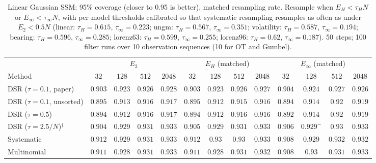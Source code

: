 \begin{table}[ht]
\centering
\small
\caption{Linear Gaussian SSM: 95\% coverage (closer to 0.95 is better), matched resampling rate. Resample when $E_H<\tau_HN$ or $E_\infty<\tau_\infty N$, with per-model thresholds calibrated so that systematic resampling resamples as often as under $E_2<0.5N$ (linear: $\tau_H{=}0.615$, $\tau_\infty{=}0.223$; ungm: $\tau_H{=}0.567$, $\tau_\infty{=}0.351$; volatility: $\tau_H{=}0.587$, $\tau_\infty{=}0.194$; bearing: $\tau_H{=}0.596$, $\tau_\infty{=}0.285$; lorenz63: $\tau_H{=}0.599$, $\tau_\infty{=}0.255$; lorenz96: $\tau_H{=}0.62$, $\tau_\infty{=}0.187$). 50 steps; 100 filter runs over 10 observation sequences (10 for OT and Gumbel).}
\label{tab:trigger-matched-linear-coverage95}
\begin{adjustbox}{max width=\linewidth}
\begin{tabular}{lcccc|cccc|cccc}
\toprule
 & \multicolumn{4}{c}{$E_2$} & \multicolumn{4}{c}{$E_H$ (matched)} & \multicolumn{4}{c}{$E_\infty$ (matched)} \\
\cmidrule(lr){2-5} \cmidrule(lr){6-9} \cmidrule(lr){10-13}
Method & $32$ & $128$ & $512$ & $2048$ & $32$ & $128$ & $512$ & $2048$ & $32$ & $128$ & $512$ & $2048$ \\
\midrule
DSR ($\tau{=}0.1$, paper) & $0.903$ & $0.923$ & $0.926$ & $\mathbf{0.928}$ & $0.903$ & $0.923$ & $0.926$ & $0.927$ & $\mathbf{0.904}$ & $\mathbf{0.924}$ & $\mathbf{0.927}$ & $0.926$ \\
DSR ($\tau{=}0.1$, unsorted) & $0.895$ & $0.913$ & $0.916$ & $0.917$ & $\mathbf{0.895}$ & $0.912$ & $0.915$ & $0.916$ & $0.894$ & $\mathbf{0.914}$ & $\mathbf{0.92}$ & $\mathbf{0.919}$ \\
DSR ($\tau{=}0.5$) & $0.894$ & $0.912$ & $0.916$ & $0.917$ & $\mathbf{0.894}$ & $0.912$ & $0.916$ & $0.916$ & $0.892$ & $\mathbf{0.914}$ & $\mathbf{0.92}$ & $\mathbf{0.919}$ \\
DSR ($\tau{=}2.5/N$)$^\dagger$ & $0.904$ & $\mathbf{0.929}$ & $\mathbf{0.931}$ & $0.933$ & $0.905$ & $\mathbf{0.929}$ & $\mathbf{0.931}$ & $\mathbf{0.933}$ & $\mathbf{0.906}$ & $\mathbf{0.929}^{-}$ & $0.93$ & $0.933$ \\
\midrule
Systematic & $0.912$ & $0.929$ & $0.931$ & $\mathbf{0.933}$ & $\mathbf{0.912}$ & $\mathbf{0.93}$ & $0.93$ & $\mathbf{0.933}$ & $0.908$ & $0.929$ & $\mathbf{0.932}$ & $0.932$ \\
Multinomial & $0.911$ & $0.928$ & $\mathbf{0.931}$ & $0.933$ & $\mathbf{0.911}$ & $0.928$ & $0.931$ & $0.932$ & $0.908$ & $\mathbf{0.93}$ & $\mathbf{0.931}$ & $\mathbf{0.933}$ \\

\end{tabular}
\end{adjustbox}
\end{table}
